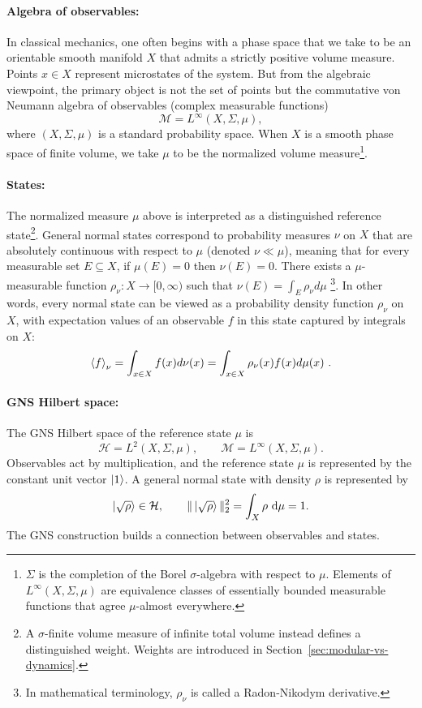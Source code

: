 \documentclass[a4paper,11pt]{article}
\theoremstyle{definition}
\newcommand{\dd}{\,\mathrm{d}}
\newcommand{\cH}{\mathcal{H}}
\newcommand{\mM}{\mathcal{M}}
\begin{document}
\paragraph{Algebra of observables:} In classical mechanics, one often begins with a phase space that we take to be an orientable smooth manifold \(X\) that admits a strictly positive volume measure. Points \(x\in X\) represent microstates of the system. But from the algebraic viewpoint, the primary object is not the set of points but the commutative von Neumann algebra of observables (complex measurable functions)
\[
\mM=L^\infty(X,\Sigma,\mu),
\]
where \((X,\Sigma,\mu)\) is a standard probability space. When $X$ is a smooth phase space of finite volume, we take $\mu$ to be the normalized volume measure\footnote{$\Sigma$ is the completion of the Borel $\sigma$-algebra with respect to $\mu$. Elements of $L^\infty(X,\Sigma,\mu)$ are equivalence classes of essentially bounded measurable functions that agree $\mu$-almost everywhere.}.

\paragraph{States:} The normalized measure $\mu$ above is interpreted as a distinguished reference state\footnote{A $\sigma$-finite volume measure of infinite total volume instead defines a distinguished weight. Weights are introduced in Section~\ref{sec:modular-vs-dynamics}.}. General normal states correspond to probability measures $\nu$ on $X$ that are absolutely continuous with respect to $\mu$ (denoted $\nu\ll \mu$), meaning that for every measurable set $E\subseteq X$, if $\mu(E)=0$ then $\nu(E)=0$.
There exists a $\mu$-measurable function $\rho_\nu:X\to [0,\infty)$ such that $\nu(E)=\int_E \rho_\nu d\mu$ \footnote{In mathematical terminology, $\rho_\nu$ is called a Radon-Nikodym derivative.}. In other words, every normal state can be viewed as a probability density function $\rho_\nu$ on $X$, with expectation values of an observable $f$ in this state captured by integrals on $X$:
\begin{align}
\braket{f}_\nu=\int_{x\in X}f(x) d\nu(x)=\int_{x\in X} \rho_\nu(x) f(x) d\mu(x)\ .
\end{align}

\paragraph{GNS Hilbert space:} The GNS Hilbert space of the reference state $\mu$ is
\[
  \cH=L^2(X,\Sigma,\mu),
  \qquad
  \mM=L^\infty(X,\Sigma,\mu).
\]
Observables act by multiplication, and the reference state $\mu$ is represented by the constant unit vector $\ket{1}$. A general normal state with density $\rho$ is represented by
\[
  \ket{\sqrt{\rho}}\in\cH,
  \qquad
  \|\ket{\sqrt{\rho}}\|_2^2=\int_X\rho\,\dd\mu=1.
\]
The GNS construction builds a connection between observables and states.
\end{document}

